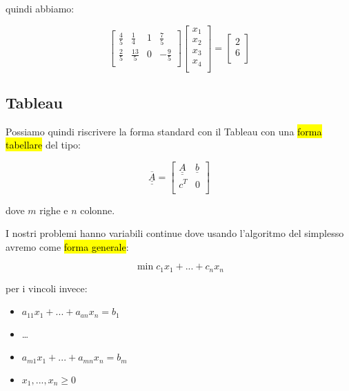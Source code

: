 \begin{enumerate}
		quindi abbiamo:
		
		$$
		\left[ {\begin{array}{cccc}
			\frac{4}{5} & \frac{1}{4} & 1 & \frac{7}{5} \\
			\frac{2}{5} & \frac{13}{5} & 0 & -\frac{9}{5} \\
		\end{array} } \right]
		\left[ {\begin{array}{c}
			x_1 \\
			x_2 \\
			x_3 \\
			x_4 \\
		\end{array} } \right]
		=
		\left[ {\begin{array}{c}
			2 \\
			6 \\
		\end{array} } \right]
		$$
	
\end{enumerate}


\subsection{Tableau}

Possiamo quindi riscrivere la forma standard con il Tableau con una \hl{forma tabellare} del tipo:

$$ \underline{\underline{\overline{A}}} =
\left[ {\begin{array}{cc}
	\underline{\underline{A}} & \underline{b} \\
	c^T & 0 \\
\end{array} } \right]
$$

dove $m$ righe e $n$ colonne.

I nostri problemi hanno variabili continue dove usando l'algoritmo del simplesso avremo come \hl{forma generale}:

$$\min c_1x_1 + ... + c_n x_n$$

per i vincoli invece:

\begin{itemize}
	\item $a_{11}x_1 + ... + a_{an}x_n = b_1$
	\item \dots
	\item $a_{m1}x_1 + ... + a_{mn}x_n = b_m$
	\item $x_1, ..., x_n \geq 0$
\end{itemize}

